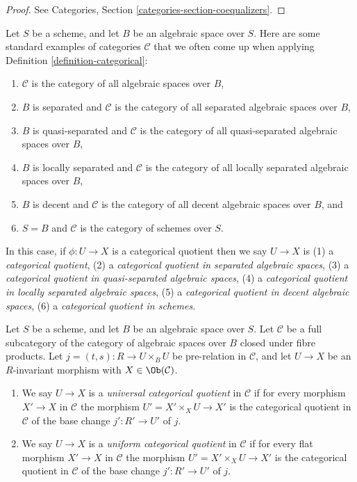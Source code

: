 \begin{proof}
See Categories, Section \ref{categories-section-coequalizers}.
\end{proof}

\begin{example}
\label{example-categories}
Let $S$ be a scheme, and let $B$ be an algebraic space over $S$.
Here are some standard examples of categories $\mathcal{C}$
that we often come up when applying
Definition \ref{definition-categorical}:
\begin{enumerate}
\item $\mathcal{C}$ is the category of all algebraic spaces over $B$,
\item $B$ is separated and $\mathcal{C}$ is the category of all separated
algebraic spaces over $B$,
\item $B$ is quasi-separated and $\mathcal{C}$ is the category of all
quasi-separated algebraic spaces over $B$,
\item $B$ is locally separated and $\mathcal{C}$ is the category of all
locally separated algebraic spaces over $B$,
\item $B$ is decent and $\mathcal{C}$ is the category of all decent algebraic
spaces over $B$, and
\item $S = B$ and $\mathcal{C}$ is the category of schemes over $S$.
\end{enumerate}
In this case, if $\phi : U \to X$ is a categorical quotient then we say
$U \to X$ is
(1) a {\it categorical quotient},
(2) a {\it categorical quotient in separated algebraic spaces},
(3) a {\it categorical quotient in quasi-separated algebraic spaces},
(4) a {\it categorical quotient in locally separated algebraic spaces},
(5) a {\it categorical quotient in decent algebraic spaces},
(6) a {\it categorical quotient in schemes}.
\end{example}

\begin{definition}
\label{definition-universal-categorical}
Let $S$ be a scheme, and let $B$ be an algebraic space over $S$.
Let $\mathcal{C}$ be a full subcategory of the category of algebraic
spaces over $B$ closed under fibre products.
Let $j = (t, s) : R \to U \times_B U$ be pre-relation in
$\mathcal{C}$, and let $U \to X$ be an $R$-invariant morphism with
$X \in \Ob(\mathcal{C})$.
\begin{enumerate}
\item We say $U \to X$ is a {\it universal categorical quotient}
in $\mathcal{C}$ if for every morphism $X' \to X$ in $\mathcal{C}$
the morphism $U' = X' \times_X U \to X'$ is the categorical quotient in
$\mathcal{C}$ of the base change $j' : R' \to U'$ of $j$.
\item We say $U \to X$ is a {\it uniform categorical quotient}
in $\mathcal{C}$ if for every flat morphism $X' \to X$ in $\mathcal{C}$
the morphism $U' = X' \times_X U \to X'$ is the categorical quotient in
$\mathcal{C}$ of the base change $j' : R' \to U'$ of $j$.
\end{enumerate}
\end{definition}

